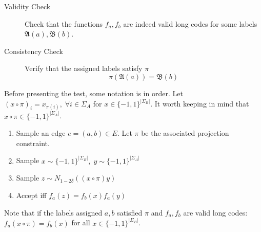 \begin{description}
  \item[Validity Check] Check that the functions $f_a,f_b$ are indeed valid long codes for some labels $\mathfrak{A}(a),\mathfrak{B}(b)$.
  \item[Consistency Check] Verify that the assigned labels satisfy $\pi$
  \[ \pi(\mathfrak{A}(a)) =  \mathfrak{B}(b)\]
\end{description}

Before presenting the test, some notation is in order. Let $(x \circ \pi)_i = x_{\pi(i)}, \; \forall i \in \Sigma_A$ for $x \in \{-1,1\}^{|\Sigma_B|}$. It worth keeping in mind that $x \circ \pi \in \{-1,1\}^{|\Sigma_A|}$.

\begin{enumerate}
  \item Sample an edge $e = (a,b) \in E$. Let $\pi$ be the associated projection constraint.

  \item Sample $x \sim \{-1,1\}^{|\Sigma_B|}, \; y \sim \{-1,1\}^{|\Sigma_A|}$
  \item Sample $z \sim N_{1 - 2\delta}((x \circ \pi)y)$
  \item Accept iff $f_a(z) = f_b(x)f_a(y)$
\end{enumerate}

Note that if the labels assigned $a,b$ satisfied $\pi$ and $f_a,f_b$ are valid long codes: $f_a(x \circ \pi) = f_b(x )$ for all $x \in \{-1,1\}^{|\Sigma_B|}$.

